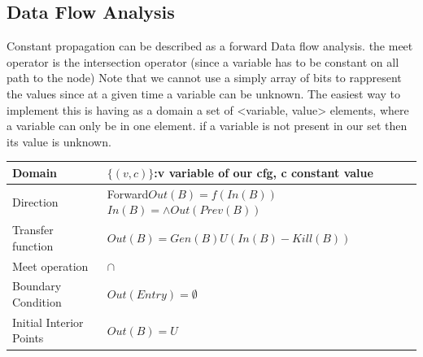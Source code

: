 \documentclass{article}
\begin{document}
	\subsection{Data Flow Analysis}
	Constant propagation can be described as a forward Data flow analysis. the meet operator is the intersection operator (since a variable has to be constant on all path to the node)\newline\newline
	Note that we cannot use a simply array of bits to rappresent the values since at a given time a variable can be unknown. The easiest way to implement this is having as a domain a set of <variable, value> elements, where a variable can only be in one element. if a variable is not present in our set then its value is unknown.
	\newline
	\begin{tabularx}{1.2\textwidth} { 
			| >{\raggedright\arraybackslash}X 
			| >{\centering\arraybackslash}X 
			| >{\raggedleft\arraybackslash}X | }
		\hline
		Domain & $\{(v,c)\}$:v variable of our cfg, c constant value   \\
		\hline
		Direction & Forward\newline $Out(B) = f(In(B))$\newline $In(B)=\wedge Out(Prev(B))$  \\
		\hline
		Transfer function & $Out(B)=Gen(B)U(In(B)-Kill(B))$  \\
		\hline
		Meet operation & $\cap$  \\
		\hline
		Boundary Condition & $Out(Entry)=\emptyset$  \\
		\hline
		Initial Interior Points & $Out(B)=U$  \\
		\hline
	\end{tabularx}
	\newpage
\end{document}
